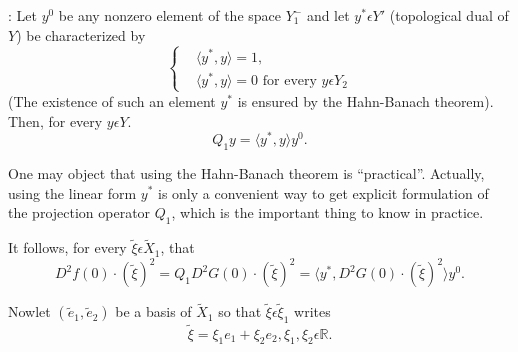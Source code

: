 \medskip
{}: Let $y^{0}$ be any nonzero element of the space $Y_{1}^{-}$ and let $y^{*} \epsilon Y'$ (topological dual of $Y$) be characterized by
\begin{equation*}
\begin{cases}
&  \langle y^{*} , y \rangle = 1,\\
&  \langle y^{*} , y \rangle = 0 \text{ for every } y \epsilon Y_{2}
\end{cases}\tag{3.7}\label{chap1-eq3.7}
\end{equation*}
(The existence of such an element $y^{*}$ is ensured by the Hahn-Banach theorem). Then, for every $y \epsilon Y$.
\begin{equation*}
Q_{1}y = \langle y^{*}, y \rangle y^{0}.\tag{3.8}\label{chap1-eq3.8}
\end{equation*}

\begin{remark}\label{chap1-rem3.4}
One may object that using the Hahn-Banach theorem is ``practical''. Actually, using the linear form $y^{*}$ is only a convenient way to get explicit formulation of the projection operator $Q_{1}$, which is the important thing to know in practice.
\end{remark}

It follows, for every $\widetilde{\xi} \epsilon \widetilde{X}_{1}$, that
$$
D^{2}f(0) \cdot (\widetilde{\xi})^{2} = Q_{1}D^{2}G(0) \cdot (\widetilde{\xi})^{2} = \langle y^{*}, D^{2}G(0) \cdot (\widetilde{\xi})^{2} \rangle y^{0}.
$$

Now\pageoriginale let $(\widetilde{e}_{1}, \widetilde{e}_{2})$ be a basis of $\widetilde{X}_{1}$ so that $\widetilde{\xi} \epsilon \widetilde{\xi}_{1}$ writes
$$
\widetilde{\xi} = \xi_{1} e_{1} + \xi_{2} e_{2} , \xi_{1}, \xi_{2} \epsilon \mathbb{R}.
$$

